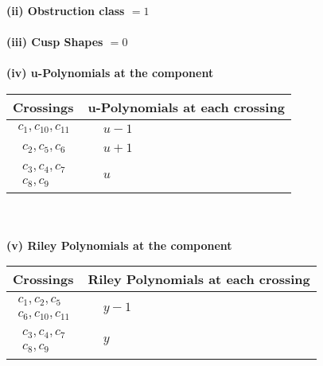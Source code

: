 \documentclass[1p]{elsarticle_modified}
\theoremstyle{definition}
\begin{document}
\flushleft \textbf{(ii) Obstruction class $= 1$}\\~\\
\flushleft \textbf{(iii) Cusp Shapes $= 0$}\\~\\
\newpage\renewcommand{\arraystretch}{1}
\flushleft \textbf{(iv) u-Polynomials at the component}\newline \\
\begin{tabular}{m{50pt}|m{274pt}}
Crossings & \hspace{64pt}u-Polynomials at each crossing \\
\hline $$\begin{aligned}c_{1},c_{10},c_{11}\end{aligned}$$&$\begin{aligned}
&u-1
\end{aligned}$\\
\hline $$\begin{aligned}c_{2},c_{5},c_{6}\end{aligned}$$&$\begin{aligned}
&u+1
\end{aligned}$\\
\hline $$\begin{aligned}c_{3},c_{4},c_{7}\\c_{8},c_{9}\end{aligned}$$&$\begin{aligned}
&u
\end{aligned}$\\
\hline
\end{tabular}\\~\\
\newpage\renewcommand{\arraystretch}{1}
\flushleft \textbf{(v) Riley Polynomials at the component}\newline \\
\begin{tabular}{m{50pt}|m{274pt}}
Crossings & \hspace{64pt}Riley Polynomials at each crossing \\
\hline $$\begin{aligned}c_{1},c_{2},c_{5}\\c_{6},c_{10},c_{11}\end{aligned}$$&$\begin{aligned}
&y-1
\end{aligned}$\\
\hline $$\begin{aligned}c_{3},c_{4},c_{7}\\c_{8},c_{9}\end{aligned}$$&$\begin{aligned}
&y
\end{aligned}$\\
\hline
\end{tabular}\\~\\
\end{document}

